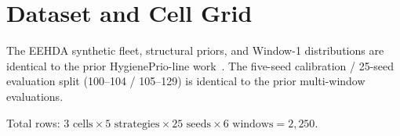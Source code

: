 \section{Dataset and Cell Grid}

The EEHDA synthetic fleet, structural priors, and Window-1 distributions
are identical to the prior HygienePrio-line work~\cite{paper4hygieneprio,paper5temporal,paper6capacity,paper7online}. The five-seed calibration / 25-seed
evaluation split (100--104 / 105--129) is identical to the prior multi-window evaluations.



Total rows: $3 \text{ cells} \times 5 \text{ strategies} \times 25 \text{ seeds}
\times 6 \text{ windows} = 2{,}250$.
